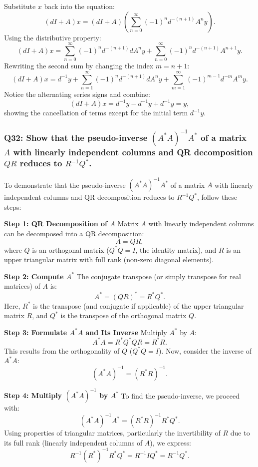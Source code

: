 \documentclass[8pt]{article}
\begin{document}
Substitute \(x\) back into the equation:
\[
(dI + A)x = (dI + A) \left( \sum_{n=0}^{\infty} (-1)^n d^{-(n+1)} A^n y \right).
\]
Using the distributive property:
\[
(dI + A)x = \sum_{n=0}^{\infty} (-1)^n d^{-(n+1)} d A^n y + \sum_{n=0}^{\infty} (-1)^n d^{-(n+1)} A^{n+1} y.
\]
Rewriting the second sum by changing the index \(m = n + 1\):
\[
(dI + A)x = d^{-1} y + \sum_{n=1}^{\infty} (-1)^n d^{-(n+1)} d A^n y + \sum_{m=1}^{\infty} (-1)^{m-1} d^{-m} A^m y.
\]
Notice the alternating series signs and combine:
\[
(dI + A)x = d^{-1} y - d^{-1} y + d^{-1} y = y,
\]
showing the cancellation of terms except for the initial term \(d^{-1} y\).

\subsubsection*{Q32: Show that the pseudo-inverse \( (A^*A)^{-1}A^* \) of a matrix \(A\) with linearly independent columns and QR decomposition \(QR\) reduces to \(R^{-1}Q^*\).}

To demonstrate that the pseudo-inverse \((A^*A)^{-1}A^*\) of a matrix \(A\) with linearly independent columns and QR decomposition reduces to \(R^{-1}Q^*\), follow these steps:

\textbf{Step 1: QR Decomposition of \(A\)}
Matrix \(A\) with linearly independent columns can be decomposed into a QR decomposition:
\[
A = QR,
\]
where \(Q\) is an orthogonal matrix (\(Q^*Q = I\), the identity matrix), and \(R\) is an upper triangular matrix with full rank (non-zero diagonal elements).

\textbf{Step 2: Compute \(A^*\)}
The conjugate transpose (or simply transpose for real matrices) of \(A\) is:
\[
A^* = (QR)^* = R^*Q^*.
\]
Here, \(R^*\) is the transpose (and conjugate if applicable) of the upper triangular matrix \(R\), and \(Q^*\) is the transpose of the orthogonal matrix \(Q\).

\textbf{Step 3: Formulate \(A^*A\) and Its Inverse}
Multiply \(A^*\) by \(A\):
\[
A^*A = R^*Q^*QR = R^*R.
\]
This results from the orthogonality of \(Q\) (\(Q^*Q = I\)). Now, consider the inverse of \(A^*A\):
\[
(A^*A)^{-1} = (R^*R)^{-1}.
\]

\textbf{Step 4: Multiply \((A^*A)^{-1}\) by \(A^*\)}
To find the pseudo-inverse, we proceed with:
\[
(A^*A)^{-1}A^* = (R^*R)^{-1}R^*Q^*.
\]
Using properties of triangular matrices, particularly the invertibility of \(R\) due to its full rank (linearly independent columns of \(A\)), we express:
\[
R^{-1}(R^*)^{-1}R^*Q^* = R^{-1}IQ^* = R^{-1}Q^*.
\]
\end{document}
